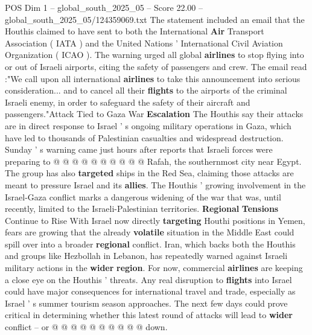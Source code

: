 \begin{textsample}{POS Dim 1 – global\_south\_2025\_05 – Score 22.00 – global\_south\_2025\_05/124359069.txt}
The statement included an email that the Houthis claimed to have sent to both the International \textbf{Air} Transport Association ( IATA ) and the United Nations ' International Civil Aviation Organization ( ICAO ).
The warning urged all global \textbf{airlines} to stop flying into or out of Israeli airports, citing the safety of passengers and crew.
The email read :"We call upon all international \textbf{airlines} to take this announcement into serious consideration... and to cancel all their \textbf{flights} to the airports of the criminal Israeli enemy, in order to safeguard the safety of their aircraft and passengers."Attack Tied to Gaza War \textbf{Escalation} The Houthis say their attacks are in direct response to Israel ' s ongoing military operations in Gaza, which have led to thousands of Palestinian casualties and widespread destruction.
Sunday ' s warning came just hours after reports that Israeli forces were preparing to @ @ @ @ @ @ @ @ @ @ Rafah, the southernmost city near Egypt.
The group has also \textbf{targeted} ships in the Red Sea, claiming those attacks are meant to pressure Israel and its \textbf{allies}.
The Houthis ' growing involvement in the Israel-Gaza conflict marks a dangerous widening of the war that was, until recently, limited to the Israeli-Palestinian territories. \textbf{Regional} \textbf{Tensions} Continue to Rise With Israel now directly \textbf{targeting} Houthi positions in Yemen, fears are growing that the already \textbf{volatile} situation in the Middle East could spill over into a broader \textbf{regional} conflict.
Iran, which backs both the Houthis and groups like Hezbollah in Lebanon, has repeatedly warned against Israeli military actions in the \textbf{wider} \textbf{region}.
For now, commercial \textbf{airlines} are keeping a close eye on the Houthis ' threats.
Any real disruption to \textbf{flights} into Israel could have major consequences for international travel and trade, especially as Israel ' s summer tourism season approaches.
The next few days could prove critical in determining whether this latest round of attacks will lead to \textbf{wider} conflict -- or @ @ @ @ @ @ @ @ @ @ down.

\end{textsample}
